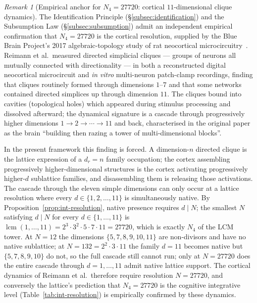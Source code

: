 \documentclass[11pt,a4paper]{article}
\theoremstyle{definition}
\theoremstyle{remark}
\newtheorem{remark}[theorem]{Remark}
\DeclareMathOperator{\lcm}{lcm}
\begin{document}
\begin{remark}[Empirical anchor for $N_{4}=27720$: cortical $11$-dimensional clique dynamics]\label{rem:cortex-27720}
The Identification Principle (\S\ref{subsec:identification}) and the Subsumption Law (\S\ref{subsec:subsumption}) admit an independent empirical confirmation that $N_{4}=27720$ is the cortical resolution, supplied by the Blue Brain Project's 2017 algebraic-topology study of rat neocortical microcircuitry~\cite{BlueBrain2017}. Reimann et al.\ measured directed simplicial cliques --- groups of neurons all mutually connected with directionality --- in both a reconstructed digital neocortical microcircuit and \emph{in vitro} multi-neuron patch-clamp recordings, finding that cliques routinely formed through dimensions $1$--$7$ and that some networks contained directed simplices up through dimension $11$. The cliques bound into cavities (topological holes) which appeared during stimulus processing and dissolved afterward; the dynamical signature is a cascade through progressively higher dimensions $1 \to 2 \to \cdots \to 11$ and back, characterised in the original paper as the brain ``building then razing a tower of multi-dimensional blocks''.

In the present framework this finding is forced. A dimension-$n$ directed clique is the lattice expression of a $d_{r}=n$ family occupation; the cortex assembling progressively higher-dimensional structures is the cortex activating progressively higher-$d$ sublattice families, and disassembling them is releasing those activations. The cascade through the eleven simple dimensions can only occur at a lattice resolution where every $d \in \{1,2,\ldots,11\}$ is simultaneously native. By Proposition~\ref{prop:int-resolution}, native presence requires $d \mid N$; the smallest $N$ satisfying $d \mid N$ for every $d \in \{1,\ldots,11\}$ is $\lcm(1,\ldots,11) = 2^{3}\cdot 3^{2}\cdot 5\cdot 7\cdot 11 = 27720$, which is exactly $N_{4}$ of the LCM tower. At $N=12$ the dimensions $\{5,7,8,9,10,11\}$ are non-divisors and have no native sublattice; at $N=132 = 2^{2}\cdot 3\cdot 11$ the family $d=11$ becomes native but $\{5,7,8,9,10\}$ do not, so the full cascade still cannot run; only at $N=27720$ does the entire cascade through $d=1,\ldots,11$ admit native lattice support. The cortical dynamics of Reimann et al.\ therefore require resolution $N=27720$, and conversely the lattice's prediction that $N_{4}=27720$ is the cognitive integrative level (Table~\ref{tab:int-resolution}) is empirically confirmed by these dynamics.


\end{remark}
\end{document}
